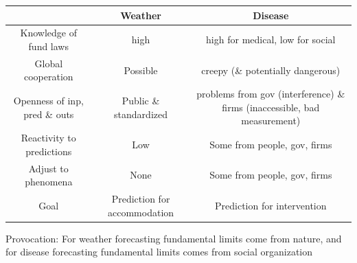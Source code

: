 \documentclass[aspectratio=169]{beamer}
\begin{document}
\begin{frame}

\tiny{
\begin{tabular}{ccc}
\hline
 & Weather & Disease\\
\hline
Knowledge of fund laws \pause & high & high for medical, low for social \pause \\ 
Global cooperation \pause & Possible & creepy (\& potentially dangerous)  \pause \\
Openness of inp, pred \& outs \pause & Public \& standardized & problems from gov (interference) \& firms (inaccessible, bad measurement) \pause \\ 
Reactivity to predictions \pause & Low & Some from people, gov, firms  \pause \\
Adjust to phenomena \pause & None & Some from people, gov, firms \pause \\ 
Goal \pause & Prediction for accommodation & Prediction for intervention \pause \\ 
\hline
\end{tabular}
}

\end{frame}
\begin{frame}

\begin{center}
Provocation:  For weather forecasting fundamental limits come from nature, and for disease forecasting fundamental limits comes from social organization
\end{center}

\end{frame}
\end{document}
